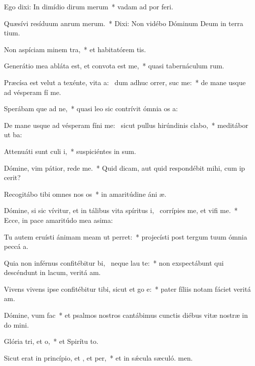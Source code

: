 \item Ego dixi: In dimídio dirum merum~* vadam ad por feri.
\item Quæsívi resíduum anrum merum.~* Dixi: Non vidébo Dóminum Deum in terra tium.
\item Non aspíciam minem tra,~* et habitatórem tis.
\item Generátio mea abláta est, et convota est  me,~* quasi tabernáculum rum.
\item Præcísa est velut a texénte, vita a:~\pscross{} dum adhuc orrer, suc me:~* de mane usque ad vésperam fí me.
\item Sperábam que ad ne,~* quasi leo sic contrívit ómnia os a:
\item De mane usque ad vésperam fíni me:~\pscross{} sicut pullus hirúndinis  clabo,~* meditábor ut ba:
\item Attenuáti sunt culi i,~* suspiciéntes in sum.
\item Dómine, vim pátior, rede  me.~* Quid dicam, aut quid respondébit mihi, cum ip cerit?
\item Recogitábo tibi omnes nos os~* in amaritúdine áni æ.
\item Dómine, si sic vívitur, et in tálibus vita spíritus i,~\pscross{} corrípies me, et vifi me.~* Ecce, in pace amaritúdo mea asima:
\item Tu autem eruísti ánimam meam ut  perret:~* projecísti post tergum tuum ómnia peccá a.
\item Quia non inférnus confitébitur bi,~\pscross{} neque  lau te:~* non exspectábunt qui descéndunt in lacum, veritá am.
\item Vivens vivens ipse confitébitur tibi, sicut et go e:~* pater fíliis notam fáciet veritá am.
\item Dómine, vum  fac~* et psalmos nostros cantábimus cunctis diébus vitæ nostræ in do mini.
\item Glória tri, et o,~* et Spirítu to.
\item Sicut erat in princípio, et , et per,~* et in sǽcula sæculó. men.
